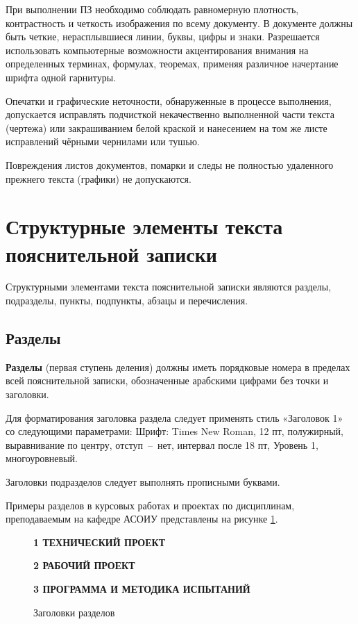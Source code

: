 При выполнении ПЗ необходимо соблюдать равномерную плотность, контрастность и
четкость изображения по всему документу. В документе должны быть четкие, нерасплывшиеся
линии, буквы, цифры и знаки. Разрешается использовать компьютерные возможности
акцентирования внимания на определенных терминах, формулах, теоремах, применяя
различное начертание шрифта одной гарнитуры.

Опечатки и графические неточности, обнаруженные в процессе выполнения, допускается
исправлять подчисткой некачественно выполненной части текста (чертежа) или закрашиванием
белой краской и нанесением на том же листе исправлений чёрными чернилами или тушью.

Повреждения листов документов, помарки и следы не полностью удаленного прежнего
текста (графики) не допускаются.

\section{Структурные элементы текста пояснительной записки}

Структурными элементами текста пояснительной записки являются разделы,
подразделы, пункты, подпункты, абзацы и перечисления.

\subsection{Разделы}

{\bf Разделы} (первая ступень деления) должны иметь порядковые номера в пределах всей
пояснительной записки, обозначенные арабскими цифрами без точки и заголовки.

Для форматирования заголовка раздела следует применять стиль «Заголовок 1» со
следующими параметрами: Шрифт: Times New Roman, 12 пт, полужирный, выравнивание по
центру, отступ~--~нет, интервал после 18 пт, Уровень 1, многоуровневый.

Заголовки подразделов следует выполнять прописными буквами.

Примеры разделов в курсовых работах и проектах по дисциплинам, преподаваемым на
кафедре АСОИУ представлены на рисунке \ref{headers}.

\begin{figure}[h]
	\begin{framed}
		\setlength{\parindent}{1.25cm}
		\linespread{1.5}
		\centerline{\bf\uppercase{1 Технический проект}}
		\centerline{\bf\uppercase{2 Рабочий проект}}
		\centerline{\bf\uppercase{3 Программа и методика испытаний}}
	\end{framed}
	\caption{Заголовки разделов}
	\label{headers}
\end{figure}

